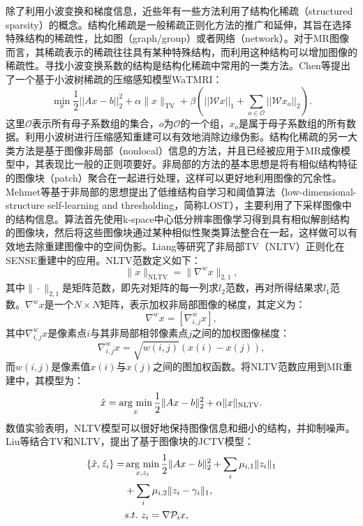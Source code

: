 除了利用小波变换和梯度信息，近些年有一些方法利用了结构化稀疏（structured sparsity）的概念。结构化稀疏是一般稀疏正则化方法的推广和延伸，其旨在选择特殊结构的稀疏性，比如图（graph/group）或者网络（network）。对于MR图像而言，其稀疏表示的稀疏往往具有某种特殊结构，而利用这种结构可以增加图像的稀疏性。寻找小波变换系数的结构是结构化稀疏中常用的一类方法。Chen等提出了一个基于小波树稀疏的压缩感知模型WaTMRI\cite{tree,chen2014exploiting}：
\begin{equation}
	\min_x\frac{1}{2}||Ax-b||^2_2+\alpha \|x\|_\mathrm{TV} + \beta (||\mathcal{W}x||_1 + \sum_{o\in \mathscr{O}}||\mathcal{W}x_o||_2).
\end{equation}
这里$\mathscr{O}$表示所有母子系数组的集合，$o$为$\mathscr{O}$的一个组，$x_o$是属于母子系数组的所有数据。利用小波树进行压缩感知重建可以有效地消除边缘伪影。结构化稀疏的另一大类方法是基于图像非局部（nonlocal）\cite{peyre2008non,lou2010image,gilboa2008nonlocal}信息的方法，并且已经被应用于MR成像模型中，其表现比一般的正则项要好。非局部的方法的基本思想是将有相似结构特征的图像块（patch）聚合在一起进行处理，这样可以更好地利用图像的冗余性。Mehmet等\cite{akccakaya2011low}基于非局部的思想提出了低维结构自学习和阈值算法（low-dimensional-structure self-learning and thresholding，简称LOST），主要利用了下采样图像中的结构信息。算法首先使用k-space中心低分辨率图像学习得到具有相似解剖结构的图像块，然后将这些图像块通过某种相似性聚类算法整合在一起，这样做可以有效地去除重建图像中的空间伪影。Liang等\cite{liang2011sensitivity}研究了非局部TV（NLTV）正则化在SENSE重建中的应用。NLTV范数定义如下：
$$\|x\|_{\mathrm{NLTV}}=\|\nabla^wx\|_{2,1},$$
其中$\|\cdot\|_{2,1}$是矩阵范数，即先对矩阵的每一列求$l_2$范数，再对所得结果求$l_1$范数。$\nabla^wx$是一个$N\times N$矩阵，表示加权非局部图像的梯度，其定义为：
$$\nabla^wx=[\nabla^w_{i,j}x],$$
其中$\nabla^w_{i,j}x$是像素点$i$与其非局部相邻像素点$j$之间的加权图像梯度：
$$\nabla^w_{i,j}x=\sqrt{w(i,j)}(x(i)-x(j)),$$
而$w(i,j)$是像素值$x(i)$与$x(j)$之间的图加权函数。将NLTV范数应用到MR重建中，其模型为：
\begin{equation}
	\hat{x}=\argmin_x \frac{1}{2}\|Ax-b\|^2_2+\alpha\|x\|_{\mathrm{NLTV}}.
\end{equation}
数值实验表明，NLTV模型可以很好地保持图像信息和细小的结构，并抑制噪声。Liu\cite{liu2017mri}等结合TV和NLTV，提出了基于图像块的JCTV模型：
\begin{equation}
\begin{aligned}
	\{\hat{x},\hat{z_i}\}=&\argmin_{x,z_i}\frac{1}{2}\|Ax-b\|_2^2+\sum_i\mu_{i,1}\|z_i\|_1\\
	&+\sum_i\mu_{i,2}\|z_i-\gamma_i\|_1,\\
	&s.t.\ z_i=\nabla\mathcal{P}_ix,
\end{aligned}
\end{equation}
